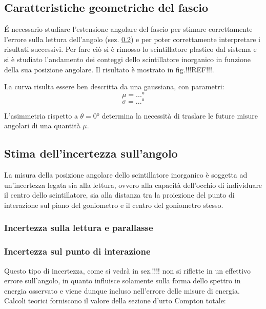 \documentclass[11pt]{article}
\begin{document}
\subsection{Caratteristiche geometriche del fascio} \label{subsec:geom_fascio}
\'E necessario studiare l'estensione angolare del fascio per stimare correttamente l'errore sulla lettura dell'angolo (sez. \ref{subsec:err_angolo}) e per poter correttamente interpretare i risultati successivi. Per fare ciò si è rimosso lo scintillatore plastico dal sistema e si è studiato l'andamento dei conteggi dello scintillatore inorganico in funzione della sua posizione angolare. Il risultato è mostrato in fig.!!!REF!!!.


La curva risulta essere ben descritta da una gaussiana, con parametri:
\begin{equation}
\mu = ...°
\nonumber
\end{equation}
\begin{equation}
\sigma = ...°
\nonumber
\end{equation}


L'asimmetria rispetto a $\theta = 0°$ determina la necessità di traslare le future misure angolari di una quantità $\mu$.


\subsection{Stima dell'incertezza sull'angolo} \label{subsec:err_angolo}
La misura della posizione angolare dello scintillatore inorganico è soggetta ad un'incertezza legata sia alla lettura, ovvero alla capacità dell'occhio di individuare il centro dello scintillatore, sia alla distanza tra la proiezione del punto di interazione sul piano del goniometro e il centro del goniometro stesso.
\subsubsection{Incertezza sulla lettura e parallasse}

\subsubsection{Incertezza sul punto di interazione}
Questo tipo di incertezza, come si vedrà in sez.!!!! non si riflette in un effettivo errore sull'angolo, in quanto influisce solamente sulla forma dello spettro in energia osservato e viene dunque incluso nell'errore delle misure di energia.  \\
\vspace{0.8 cm}
Calcoli teorici\cite{compton_total} forniscono il valore della sezione d'urto Compton totale:
\end{document}
